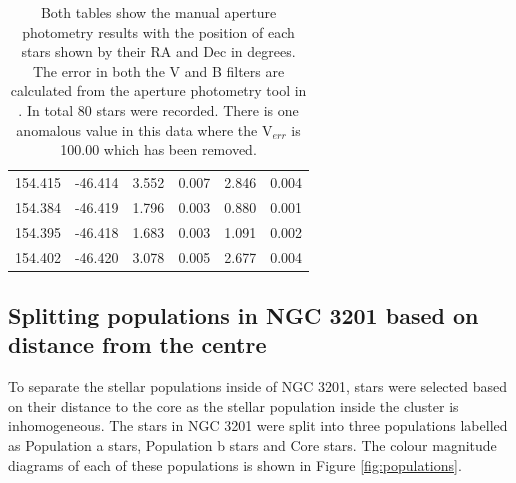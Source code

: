\documentclass[11pt]{article}
\begin{document}
\begin{table}
\begin{minipage}{0.48\paperwidth}
\begin{tabular}{cccccc}
154.415 & -46.414 & 3.552 & 0.007 & 2.846 & 0.004 \\
154.384 & -46.419 & 1.796 & 0.003 & 0.880 & 0.001 \\
154.395 & -46.418 & 1.683 & 0.003 & 1.091 & 0.002 \\
154.402 & -46.420 & 3.078 & 0.005 & 2.677 & 0.004 \\
\bottomrule
\end{tabular}
\end{minipage}
\caption*{Both tables show the manual aperture photometry results with the position of each stars shown by their RA and Dec in degrees. The error in both the V and B filters are calculated from the aperture photometry tool in \citet{gaia}. In total 80 stars were recorded. There is one anomalous value in this data where the V$_{err}$ is 100.00 which has been removed.}
\label{tab:manual}
\end{table}
\restoregeometry

\subsection{Splitting populations in NGC 3201 based on distance from the centre}

To separate the stellar populations inside of NGC 3201, stars were selected based on their distance to the core as the stellar population inside the cluster is inhomogeneous. The stars in NGC 3201 were split into three populations labelled as Population a stars, Population b stars and Core stars. The colour magnitude diagrams of each of these populations is shown in Figure \ref{fig:populations}.  
\end{document}
